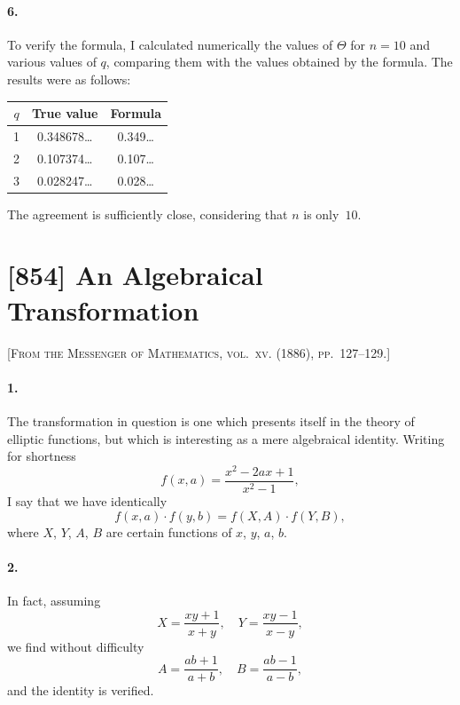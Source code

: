 \documentclass[11pt,a4paper]{book}
\begin{document}
\paragraph{6.} To verify the formula, I calculated numerically the values of $\Theta$ for $n = 10$ and various values of $q$, comparing them with the values obtained by the formula. The results were as follows:

\begin{center}
\begin{tabular}{c|c|c}
$q$ & True value & Formula \\
\hline
1 & 0.348678\ldots & 0.349\ldots \\
2 & 0.107374\ldots & 0.107\ldots \\
3 & 0.028247\ldots & 0.028\ldots \\
\end{tabular}
\end{center}

\noindent The agreement is sufficiently close, considering that $n$ is only~$10$.

\newpage
\section*{[854] An Algebraical Transformation}

\noindent\textsc{[From the Messenger of Mathematics, vol.~xv. (1886), pp.~127--129.]}

\smallskip

\paragraph{1.} The transformation in question is one which presents itself in the theory of elliptic functions, but which is interesting as a mere algebraical identity. Writing for shortness
\[
f(x, a) = \frac{x^{2} - 2ax + 1}{x^{2} - 1},
\]
I say that we have identically
\[
f(x, a) \cdot f(y, b) = f(X, A) \cdot f(Y, B),
\]
where $X$, $Y$, $A$, $B$ are certain functions of $x$, $y$, $a$, $b$.

\paragraph{2.} In fact, assuming
\[
X = \frac{xy + 1}{x + y}, \quad Y = \frac{xy - 1}{x - y},
\]
we find without difficulty
\[
A = \frac{ab + 1}{a + b}, \quad B = \frac{ab - 1}{a - b},
\]
and the identity is verified.
\end{document}
